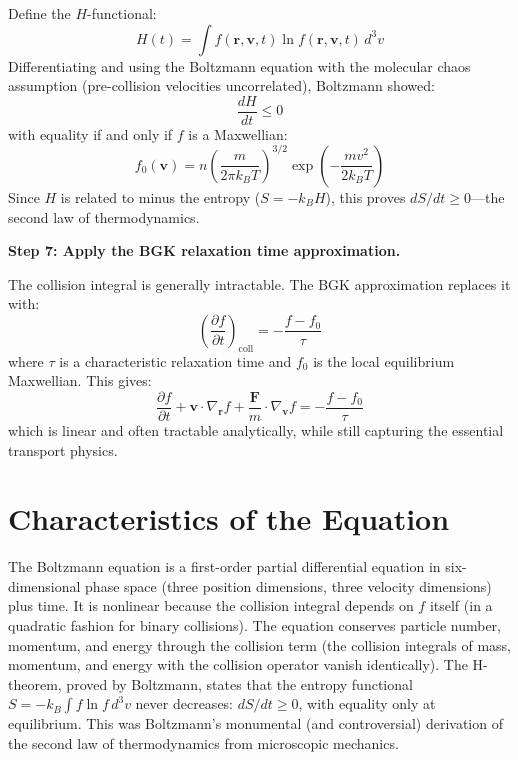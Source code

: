 Define the $H$-functional:
\begin{equation}
H(t) = \int f(\mathbf{r},\mathbf{v},t)\ln f(\mathbf{r},\mathbf{v},t)\,d^3v
\end{equation}
Differentiating and using the Boltzmann equation with the molecular chaos assumption (pre-collision velocities uncorrelated), Boltzmann showed:
\begin{equation}
\frac{dH}{dt} \leq 0
\end{equation}
with equality if and only if $f$ is a Maxwellian:
\begin{equation}
f_0(\mathbf{v}) = n\left(\frac{m}{2\pi k_BT}\right)^{3/2}\exp\left(-\frac{mv^2}{2k_BT}\right)
\end{equation}
Since $H$ is related to minus the entropy ($S = -k_B H$), this proves $dS/dt \geq 0$---the second law of thermodynamics.

\textbf{Step 7: Apply the BGK relaxation time approximation.}

The collision integral is generally intractable. The BGK approximation replaces it with:
\begin{equation}
\left(\frac{\partial f}{\partial t}\right)_{\text{coll}} = -\frac{f - f_0}{\tau}
\end{equation}
where $\tau$ is a characteristic relaxation time and $f_0$ is the local equilibrium Maxwellian. This gives:
\begin{equation}
\frac{\partial f}{\partial t} + \mathbf{v}\cdot\nabla_{\mathbf{r}} f + \frac{\mathbf{F}}{m}\cdot\nabla_{\mathbf{v}} f = -\frac{f - f_0}{\tau}
\end{equation}
which is linear and often tractable analytically, while still capturing the essential transport physics.

\section*{Characteristics of the Equation}

The Boltzmann equation is a first-order partial differential equation in six-dimensional phase space (three position dimensions, three velocity dimensions) plus time. It is nonlinear because the collision integral depends on $f$ itself (in a quadratic fashion for binary collisions). The equation conserves particle number, momentum, and energy through the collision term (the collision integrals of mass, momentum, and energy with the collision operator vanish identically). The H-theorem, proved by Boltzmann, states that the entropy functional $S = -k_B\int f\ln f\,d^3v$ never decreases: $dS/dt \geq 0$, with equality only at equilibrium. This was Boltzmann's monumental (and controversial) derivation of the second law of thermodynamics from microscopic mechanics.
